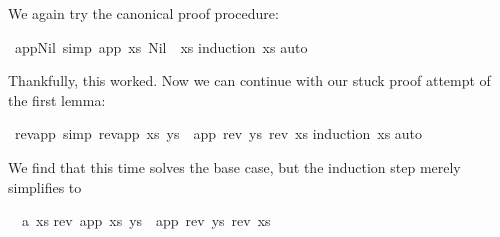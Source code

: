 \begin{isabellebody}
\begin{isamarkuptxt}
We again try the canonical proof procedure:%
\end{isamarkuptxt}%
\isamarkuptrue%
%
\endisatagproof
{\isafoldproof}%
%
\isadelimproof
%
\endisadelimproof
{}\isamarkupfalse%
\ app{}Nil{}\ {}simp{}{}\ {}app\ xs\ Nil\ {}\ xs{}\isanewline
%
\isadelimproof
%
\endisadelimproof
%
\isatagproof
{}\isamarkupfalse%
{}induction\ xs{}\isanewline
{}\isamarkupfalse%
{}auto{}\isanewline
{}\isamarkupfalse%
%
\endisatagproof
{\isafoldproof}%
%
\isadelimproof
%
\endisadelimproof
%
\begin{isamarkuptext}%
Thankfully, this worked.
Now we can continue with our stuck proof attempt of the first lemma:%
\end{isamarkuptext}%
\isamarkuptrue%
\isamarkupfalse%
\ rev{}app\ {}simp{}{}\ {}rev{}app\ xs\ ys{}\ {}\ app\ {}rev\ ys{}\ {}rev\ xs{}{}\isanewline
%
\isadelimproof
%
\endisadelimproof
%
\isatagproof
{}\isamarkupfalse%
{}induction\ xs{}\isanewline
{}\isamarkupfalse%
{}auto{}%
\begin{isamarkuptxt}%
We find that this time  solves the base case, but the
induction step merely simplifies to
\begin{isabelle}%
\ {}{}\ {}a\ xs{}\isanewline
{}rev\ {}app\ xs\ ys{}\ {}\ app\ {}rev\ ys{}\ {}rev\ xs{}\ {}\isanewline

\end{isabelle}
\end{isamarkuptxt}
\end{isabellebody}
